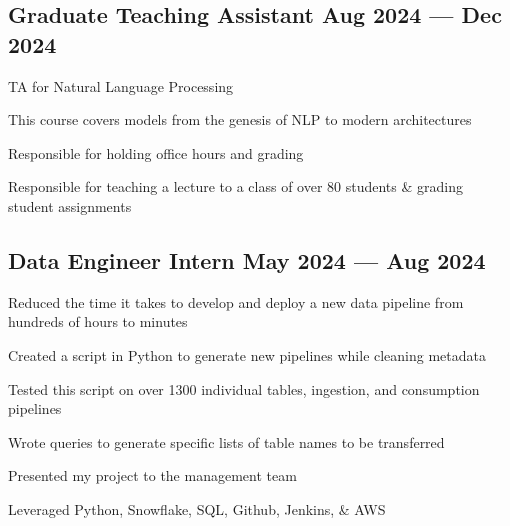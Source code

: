 \subsection{{Graduate Teaching Assistant \hfill Aug 2024 --- Dec 2024}}
\begin{zitemize}
\begin{zitemize}
\item TA for Natural Language Processing
\item This course covers models from the genesis of NLP to modern architectures
\item Responsible for holding office hours and grading 
\item Responsible for teaching a lecture to a class of over 80 students \& grading student assignments
\end{zitemize}
\end{zitemize}
\subsection{{Data Engineer Intern \hfill May 2024 --- Aug 2024}}
\begin{zitemize}
\begin{zitemize}
\item Reduced the time it takes to develop and deploy a new data pipeline from hundreds of hours to minutes
\item Created a script in Python to generate new pipelines while cleaning metadata
\item Tested this script on over 1300 individual tables, ingestion, and consumption pipelines
\item Wrote queries to generate specific lists of table names to be transferred
\item Presented my project to the management team
\item Leveraged Python, Snowflake, SQL, Github, Jenkins, \& AWS
\end{zitemize}
\end{zitemize}



